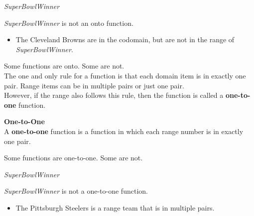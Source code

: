 \documentclass{ximera}
\begin{document}
\begin{example} \textit{SuperBowlWinner}


\textit{SuperBowlWinner} is not an onto function.


\begin{itemize}
\item The Cleveland Browns are in the codomain, but are not in the range of \textit{SuperBowlWinner}.  
\end{itemize}

\end{example}







Some functions are onto. Some are not. \\




The one and only rule for a function is that each domain item is in exactly one pair.  Range items can be in multiple pairs or just one pair. \\

However, if the range also follows this rule, then the function is called a \textbf{one-to-one} function.



\begin{definition} \textbf{\textcolor{green!50!black}{One-to-One}} \\

A \textbf{one-to-one} function is a function in which each range number is in exactly one pair.

\end{definition}




Some functions are one-to-one. Some are not. \\














\begin{example} \textit{SuperBowlWinner}


\textit{SuperBowlWinner} is not a one-to-one function.


\begin{itemize}
\item The Pittsburgh Steelers is a range team that is in multiple pairs. 
\end{itemize}

\end{example}
\end{document}
